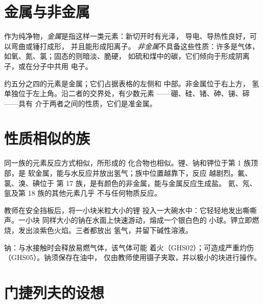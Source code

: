 \section{金属与非金属}

\begin{definition}[金属与非金属]\label{def:g9:periodic-table-first-look:metal}
作为纯净物，\emph{金属}是指这样一类元素：新切开时有光泽，
导电、导热性良好，可以弯曲或锤打成形，
并且能形成阳离子。
\emph{非金属}不具备这些性质：许多是气体，
如氧、氮、氯；固态的则暗淡、脆硬，
如硫和煤中的碳，它们倾向于形成阴离子，或在分子中共用
电子。
\end{definition}

\begin{proposition}[它们的位置]\label{prop:g9:periodic-table-first-look:where}
约五分之四的元素是金属；它们占据表格的左侧和
中部。非金属位于右上方，
氢单独位于左上角。沿二者的交界处，有少数元素
——硼、硅、锗、砷、锑、碲——具有
介于两者之间的性质，它们是准金属。
\end{proposition}

\section{性质相似的族}

\begin{proposition}[同一族的元素性质相似]\label{prop:g9:periodic-table-first-look:alike}
同一族的元素反应方式相似，所形成的
化合物也相似。锂、钠和钾位于第 1 族顶部，是
软金属，能与水反应并放出氢气；族中位置越靠下，反应
越剧烈。氟、氯、溴、碘位于
第 17 族，是有颜色的非金属，能与金属反应生成盐。
氦、氖、氩及第 18 族的其他元素几乎
不与任何物质反应。
\end{proposition}

\begin{inthelab}[锂、钠和钾与水的反应]
教师在安全挡板后，将一小块米粒大小的锂
投入一大碗水中：它轻轻地发出嘶嘶声。一小块
同样大小的钠在水面上快速游动，熔成一个银白色的
小球。钾立即燃烧，发出淡紫色火焰。三者都放出
氢气，并留下碱性溶液。
\end{inthelab}

\begin{safety}{}
钠：与水接触时会释放易燃气体，该气体可能
着火（GHS02）；可造成严重灼伤（GHS05）。钠须保存在油中，
仅由教师使用镊子夹取，并以极小的块进行操作。
\end{safety}

\section{门捷列夫的设想}

